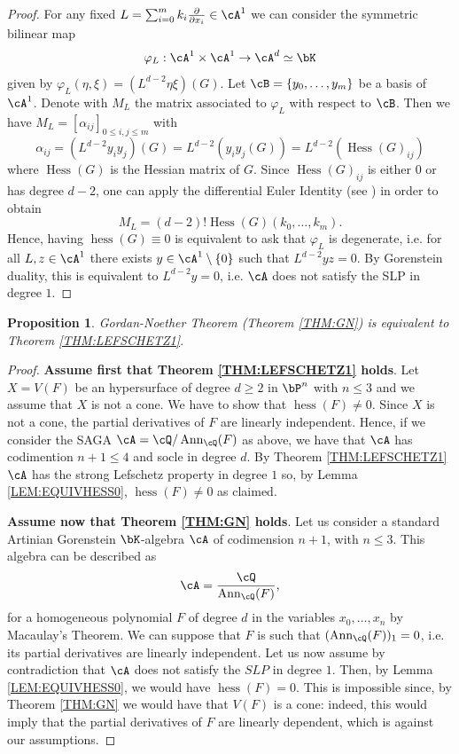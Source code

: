 \documentclass[a4paper,11pt]{amsart}
\newtheorem{proposition}[theorem]{Proposition}
\DeclareMathOperator{\Ann}{Ann}
\DeclareMathOperator{\Hess}{Hess}
\DeclareMathOperator{\hess}{hess}
\begin{document}
\begin{proof}
For any fixed $L=\sum_{i=0}^{m}k_i\frac{\partial}{\partial x_i}\in\cA^1$ we can consider the symmetric bilinear map
$$\varphi_L:\cA^1\times \cA^1\rightarrow \cA^{d}\simeq \bK$$
given by $\varphi_L(\eta,\xi)=(L^{d-2}\eta\xi)(G)$.
Let $\cB=\{y_0,\dots,y_m\}$ be a basis of $\cA^1$. Denote with $M_L$ the matrix associated to $\varphi_L$ with respect to $\cB$. Then we have $M_{L}=[\alpha_{ij}]_{0\leq i,j\leq m}$ with
$$\alpha_{ij}=(L^{d-2}y_iy_j)(G)=L^{d-2}(y_iy_j(G))=L^{d-2}(\Hess(G)_{ij})$$
where $\Hess(G)$ is the Hessian matrix of $G$. Since $\Hess(G)_{ij}$ is either 0 or has degree $d-2$, one can apply the differential Euler Identity (see \cite[Lemma 7.2.19]{Rus16}) in order to obtain
\begin{equation}
\label{EQ:ML}
M_L=(d-2)!\Hess(G)(k_0,\dots,k_m).
\end{equation}
Hence, having $\hess(G)\equiv 0$ is equivalent to ask that $\varphi_L$ is degenerate, i.e. for all $L,z\in \cA^1$ there exists $y\in \cA^1\setminus \{0\}$ such that $L^{d-2}yz=0$. By Gorenstein duality, this is equivalent to $L^{d-2}y=0$, i.e. $\cA$ does not satisfy the SLP in degree $1$.
\end{proof}

\begin{proposition}
Gordan-Noether Theorem (Theorem \ref{THM:GN}) is equivalent to Theorem \ref{THM:LEFSCHETZ1}.
\end{proposition}

\begin{proof}
{\bf Assume first that Theorem \ref{THM:LEFSCHETZ1} holds}. Let $X=V(F)$ be an hypersurface of degree $d\geq 2$ in $\bP^n$ with $n\leq 3$ and we assume that $X$ is not a cone. We have to show that $\hess(F)\neq 0$. Since $X$ is not a cone, the partial derivatives of $F$ are linearly independent. Hence, if we consider the SAGA $\cA=\cQ/\Ann_{\cQ}(F)$ as above, we have that $\cA$ has codimention $n+1\leq 4$ and socle in degree $d$. By Theorem \ref{THM:LEFSCHETZ1} $\cA$ has the strong Lefschetz property in degree $1$ so, by Lemma \ref{LEM:EQUIVHESS0}, $\hess(F)\neq 0$ as claimed.
\vspace{2mm}

{\bf Assume now that Theorem \ref{THM:GN} holds}. Let us consider a standard Artinian Gorenstein $\bK$-algebra $\cA$ of codimension $n+1$, with $n\le3$. This algebra can be described as
$$\cA=\frac{\cQ}{\Ann_{\cQ}(F)},$$
for a homogeneous polynomial $F$ of degree $d$ in the variables $x_0,\dots, x_n$ by Macaulay's Theorem. We can suppose that $F$ is such that $(\Ann_{\cQ}(F))_1=0$, i.e. its partial derivatives are linearly independent. Let us now assume by contradiction that $\cA$ does not satisfy the $SLP$ in degree $1$. Then, by Lemma \ref{LEM:EQUIVHESS0}, we would have $\hess(F)=0$. This is impossible since, by Theorem \ref{THM:GN} we would have that $V(F)$ is a cone: indeed, this would imply that the partial derivatives of $F$ are linearly dependent, which is against our assumptions. 
\end{proof}
\end{document}

